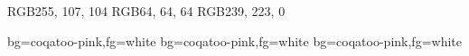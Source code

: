 

\definecolor{coqatoo-pink}      {RGB}{255, 107, 104}
\definecolor{coqatoo-gray}      {RGB}{64, 64, 64}
\definecolor{coqatoo-yellow}    {RGB}{239, 223, 0}

   {bg=coqatoo-pink,fg=white}
         {bg=coqatoo-pink,fg=white}
        {bg=coqatoo-pink,fg=white}